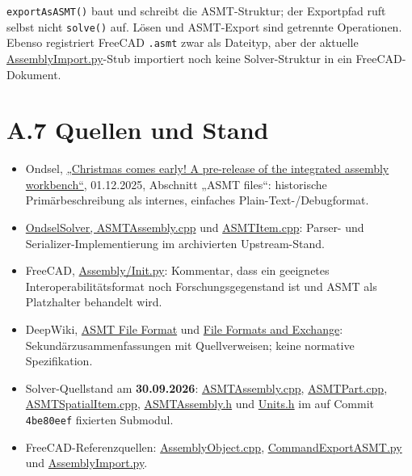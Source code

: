 \documentclass[
  12pt
]{book}
\providecommand{\tightlist}{%
  \setlength{\itemsep}{0pt}\setlength{\parskip}{0pt}}
\begin{document}
\texttt{exportAsASMT()} baut und schreibt die ASMT-Struktur; der
Exportpfad ruft selbst nicht \texttt{solve()} auf. Lösen und ASMT-Export
sind getrennte Operationen. Ebenso registriert FreeCAD \texttt{.asmt}
zwar als Dateityp, aber der aktuelle
\href{https://github.com/FreeCAD/FreeCAD/blob/main/src/Mod/Assembly/AssemblyImport.py}{AssemblyImport.py}-Stub
importiert noch keine Solver-Struktur in ein FreeCAD-Dokument.

\hypertarget{quellen-und-stand}{%
\section{\texorpdfstring{{A.7} Quellen und
Stand}{A.7 Quellen und Stand}}\label{quellen-und-stand}}

\begin{itemize}
\tightlist
\item
  Ondsel,
  \href{https://www.ondsel.com/blog/assembly-wb-prerelease/}{„Christmas
  comes early! A pre-release of the integrated assembly workbench``},
  01.12.2025, Abschnitt „ASMT files``: historische Primärbeschreibung
  als internes, einfaches Plain-Text-/Debugformat.
\item
  \href{https://github.com/Ondsel-Development/OndselSolver/blob/09d6175a/OndselSolver/ASMTAssembly.cpp}{OndselSolver,
  ASMTAssembly.cpp} und
  \href{https://github.com/Ondsel-Development/OndselSolver/blob/09d6175a/OndselSolver/ASMTItem.cpp}{ASMTItem.cpp}:
  Parser- und Serializer-Implementierung im archivierten Upstream-Stand.
\item
  FreeCAD,
  \href{https://github.com/FreeCAD/FreeCAD/blob/main/src/Mod/Assembly/Init.py}{Assembly/Init.py}:
  Kommentar, dass ein geeignetes Interoperabilitätsformat noch
  Forschungsgegenstand ist und ASMT als Platzhalter behandelt wird.
\item
  DeepWiki,
  \href{https://deepwiki.com/FreeCAD/OndselSolver/4.4-asmt-file-format}{ASMT
  File Format} und
  \href{https://deepwiki.com/Ondsel-Development/OndselSolver/4-file-formats-and-exchange}{File
  Formats and Exchange}: Sekundärzusammenfassungen mit Quellverweisen;
  keine normative Spezifikation.
\item
  Solver-Quellstand am \textbf{30.09.2026}:
  \href{vendor/OndselSolver/OndselSolver/ASMTAssembly.cpp}{ASMTAssembly.cpp},
  \href{vendor/OndselSolver/OndselSolver/ASMTPart.cpp}{ASMTPart.cpp},
  \href{vendor/OndselSolver/OndselSolver/ASMTSpatialItem.cpp}{ASMTSpatialItem.cpp},
  \href{vendor/OndselSolver/OndselSolver/ASMTAssembly.h}{ASMTAssembly.h}
  und \href{vendor/OndselSolver/OndselSolver/Units.h}{Units.h} im auf
  Commit \texttt{4be80eef} fixierten Submodul.
\item
  FreeCAD-Referenzquellen:
  \href{https://github.com/FreeCAD/FreeCAD/blob/main/src/Mod/Assembly/App/AssemblyObject.cpp}{AssemblyObject.cpp},
  \href{https://github.com/FreeCAD/FreeCAD/blob/main/src/Mod/Assembly/CommandExportASMT.py}{CommandExportASMT.py}
  und
  \href{https://github.com/FreeCAD/FreeCAD/blob/main/src/Mod/Assembly/AssemblyImport.py}{AssemblyImport.py}.
\end{itemize}

\backmatter
\end{document}
